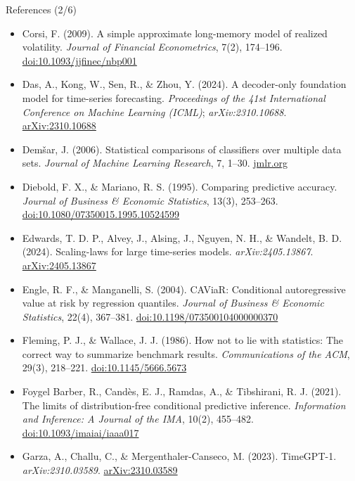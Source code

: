 \begin{frame}{References (2/6)}
\itemsize{\tiny}
\begin{itemize}
    \item Corsi, F. (2009). A simple approximate long-memory model of realized volatility. \textit{Journal of Financial Econometrics}, 7(2), 174--196. \href{https://doi.org/10.1093/jjfinec/nbp001}{doi:10.1093/jjfinec/nbp001}
    \item Das, A., Kong, W., Sen, R., \& Zhou, Y. (2024). A decoder-only foundation model for time-series forecasting. \textit{Proceedings of the 41st International Conference on Machine Learning (ICML)}; \textit{arXiv:2310.10688}. \href{https://arxiv.org/abs/2310.10688}{arXiv:2310.10688}
    \item Demšar, J. (2006). Statistical comparisons of classifiers over multiple data sets. \textit{Journal of Machine Learning Research}, 7, 1--30. \href{https://jmlr.org/papers/v7/demsar06a.html}{jmlr.org}
    \item Diebold, F. X., \& Mariano, R. S. (1995). Comparing predictive accuracy. \textit{Journal of Business \& Economic Statistics}, 13(3), 253--263. \href{https://doi.org/10.1080/07350015.1995.10524599}{doi:10.1080/07350015.1995.10524599}
    \item Edwards, T. D. P., Alvey, J., Alsing, J., Nguyen, N. H., \& Wandelt, B. D. (2024). Scaling-laws for large time-series models. \textit{arXiv:2405.13867}. \href{https://arxiv.org/abs/2405.13867}{arXiv:2405.13867}
    \item Engle, R. F., \& Manganelli, S. (2004). CAViaR: Conditional autoregressive value at risk by regression quantiles. \textit{Journal of Business \& Economic Statistics}, 22(4), 367--381. \href{https://doi.org/10.1198/073500104000000370}{doi:10.1198/073500104000000370}
    \item Fleming, P. J., \& Wallace, J. J. (1986). How not to lie with statistics: The correct way to summarize benchmark results. \textit{Communications of the ACM}, 29(3), 218--221. \href{https://doi.org/10.1145/5666.5673}{doi:10.1145/5666.5673}
    \item Foygel Barber, R., Candès, E. J., Ramdas, A., \& Tibshirani, R. J. (2021). The limits of distribution-free conditional predictive inference. \textit{Information and Inference: A Journal of the IMA}, 10(2), 455--482. \href{https://doi.org/10.1093/imaiai/iaaa017}{doi:10.1093/imaiai/iaaa017}
    \item Garza, A., Challu, C., \& Mergenthaler-Canseco, M. (2023). TimeGPT-1. \textit{arXiv:2310.03589}. \href{https://arxiv.org/abs/2310.03589}{arXiv:2310.03589}

\end{itemize}
\end{frame}
